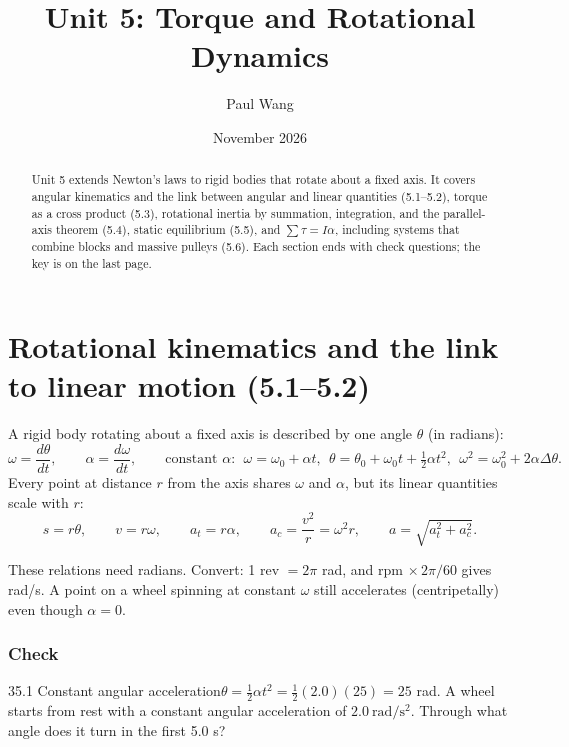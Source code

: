\documentclass[11pt]{article}
\title{Unit 5: Torque and Rotational Dynamics}
\author{Paul Wang}
\date{November 2026}
\begin{document}
\maketitle

\begin{abstract}
Unit 5 extends Newton's laws to rigid bodies that rotate about a fixed axis. It covers angular kinematics and the link between angular and linear quantities (5.1--5.2), torque as a cross product (5.3), rotational inertia by summation, integration, and the parallel-axis theorem (5.4), static equilibrium (5.5), and $\sum\tau = I\alpha$, including systems that combine blocks and massive pulleys (5.6). Each section ends with check questions; the key is on the last page.
\end{abstract}


\section{Rotational kinematics and the link to linear motion (5.1--5.2)}\label{sec:1}

A rigid body rotating about a fixed axis is described by one angle $\theta$ (in radians):
\[ \omega = \frac{d\theta}{dt}, \qquad \alpha = \frac{d\omega}{dt}, \qquad \text{constant } \alpha:\ \ \omega = \omega_0 + \alpha t,\ \ \theta = \theta_0 + \omega_0 t + \tfrac12\alpha t^2,\ \ \omega^2 = \omega_0^2 + 2\alpha\Delta\theta. \]
Every point at distance $r$ from the axis shares $\omega$ and $\alpha$, but its linear quantities scale with $r$:
\[ s = r\theta, \qquad v = r\omega, \qquad a_t = r\alpha, \qquad a_c = \frac{v^2}{r} = \omega^2 r, \qquad a = \sqrt{a_t^2 + a_c^2}. \]
\begin{trap}
These relations need radians. Convert: 1 rev $= 2\pi$ rad, and rpm $\times\,2\pi/60$ gives rad/s. A point on a wheel spinning at constant $\omega$ still accelerates (centripetally) even though $\alpha = 0$.
\end{trap}

\subsubsection{Check}\mbox{}

\begin{q}{3}{5.1 Constant angular acceleration}{$\theta = \tfrac12\alpha t^2 = \tfrac12(2.0)(25) = 25$ rad.}
A wheel starts from rest with a constant angular acceleration of $2.0\ \mathrm{rad/s^2}$. Through what angle does it turn in the first 5.0 s?
\end{q}
\end{document}
